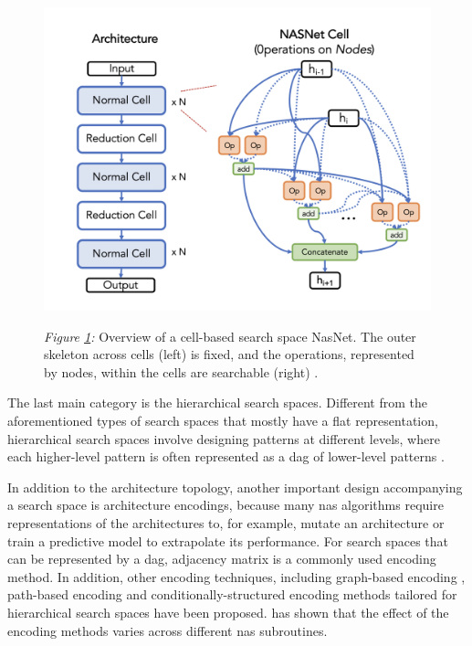 \begin{description}[leftmargin=0cm, listparindent=\parindent]
		\begin{figure}[htbp]
			\centering
			\includegraphics[scale=0.45]{figs/overview_cell_based_ss.png}
			\label{fig: cellss}
			\parbox{\linewidth}{
	 		\vspace{0.5em}
 	 		{\small \textit{Figure \ref{fig: cellss}:} Overview of a cell-based search space NasNet. The outer skeleton across cells (left) is fixed, and the operations, represented by nodes, within the cells are searchable (right) \cite{white2023survey}.
			}
 		}
		\end{figure}
		
		The last main category is the hierarchical search spaces. Different from the aforementioned types of search spaces that mostly have a flat representation, hierarchical search spaces involve designing patterns at different levels, where each higher-level pattern is often represented as a \gls{dag} of lower-level patterns \cite{christoforidis2021novel, liu2018hierarchical}.
		
	In addition to the architecture topology, another important design accompanying a search space is architecture encodings, because  many \gls{nas} algorithms require representations of the architectures to, for example, mutate an architecture or train a predictive model to extrapolate its performance. For search spaces that can be represented by a \gls{dag}, adjacency matrix is a commonly used encoding method. In addition, other encoding techniques, including graph-based encoding \cite{ning2020generic}, path-based encoding \cite{white2019bananas} and conditionally-structured encoding methods tailored for hierarchical search spaces have been proposed. \cite{white2020study} has shown that the effect of the encoding methods varies across different \gls{nas} subroutines.	
	  

\end{description}
